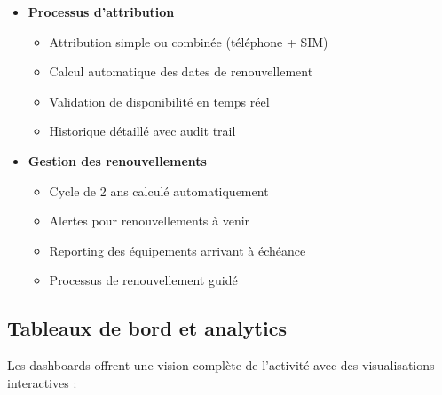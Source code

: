 \documentclass[12pt,a4paper]{report}
\begin{document}
\begin{itemize}
\item \textbf{Processus d'attribution}
  \begin{itemize}
  \item Attribution simple ou combinée (téléphone + SIM)
  \item Calcul automatique des dates de renouvellement
  \item Validation de disponibilité en temps réel
  \item Historique détaillé avec audit trail
  \end{itemize}

\item \textbf{Gestion des renouvellements}
  \begin{itemize}
  \item Cycle de 2 ans calculé automatiquement
  \item Alertes pour renouvellements à venir
  \item Reporting des équipements arrivant à échéance
  \item Processus de renouvellement guidé
  \end{itemize}
\end{itemize}

\subsection{Tableaux de bord et analytics}

Les dashboards offrent une vision complète de l'activité avec des visualisations interactives :
\end{document}
